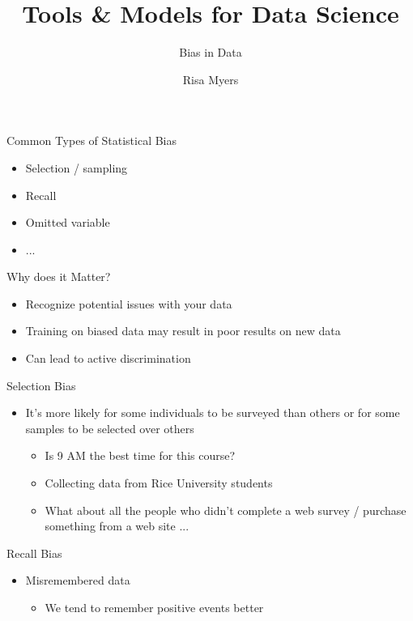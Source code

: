 \documentclass[aspectratio=169]{beamer}
\title[]
{Tools \& Models for Data Science}
\subtitle{Bias in Data}
\author[]{Risa Myers}
\institute
{
  Rice University
}
\date[]{}
\begin{document}
\begin{frame}
 \titlepage
\end{frame}

\begin{frame}{Common Types of Statistical Bias}

\begin{itemize}
	\item Selection / sampling
	\item Recall 
	\item Omitted variable
	\item ...
\end{itemize}
\end{frame}
\begin{frame}{Why does it Matter?}

\begin{itemize}
	\item Recognize potential issues with your data
	\item Training on biased data may result in poor results on new data
	\item Can lead to active discrimination 
\end{itemize}
\end{frame}
\begin{frame}{Selection Bias}

\begin{itemize}
	\item It's more likely for some individuals to be surveyed than others  or for some samples to be selected over others
	\begin{itemize}
	\item Is 9 AM the best time for this course?
	\item Collecting data from Rice University students
	\item What about all the people who didn't complete a web survey / purchase something from a web site ...
	\end{itemize}
\end{itemize}
\end{frame}
\begin{frame}{Recall Bias}

\begin{itemize}
	\item Misremembered data
	\begin{itemize}
	\item We tend to remember positive events better
	\end{itemize}
\end{itemize}
\end{frame}
\end{document}
